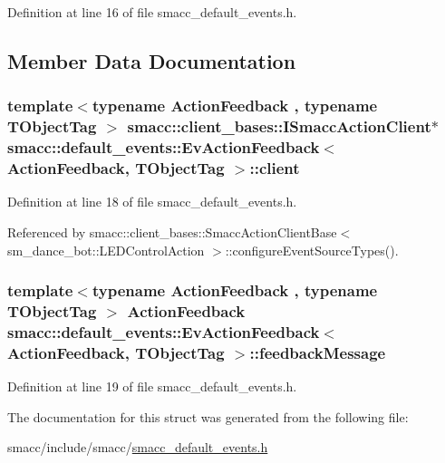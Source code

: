 Definition at line 16 of file smacc\+\_\+default\+\_\+events.\+h.



\subsection{Member Data Documentation}
\subsubsection[{\texorpdfstring{client}{client}}]{\setlength{\rightskip}{0pt plus 5cm}template$<$typename Action\+Feedback , typename T\+Object\+Tag $>$ {\bf smacc\+::client\+\_\+bases\+::\+I\+Smacc\+Action\+Client}$\ast$ {\bf smacc\+::default\+\_\+events\+::\+Ev\+Action\+Feedback}$<$ Action\+Feedback, T\+Object\+Tag $>$\+::client}\hypertarget{structsmacc_1_1default__events_1_1EvActionFeedback_a356e106d4c54e12dc81a0f3063ecff4a}{}\label{structsmacc_1_1default__events_1_1EvActionFeedback_a356e106d4c54e12dc81a0f3063ecff4a}


Definition at line 18 of file smacc\+\_\+default\+\_\+events.\+h.



Referenced by smacc\+::client\+\_\+bases\+::\+Smacc\+Action\+Client\+Base$<$ sm\+\_\+dance\+\_\+bot\+::\+L\+E\+D\+Control\+Action $>$\+::configure\+Event\+Source\+Types().

\subsubsection[{\texorpdfstring{feedback\+Message}{feedbackMessage}}]{\setlength{\rightskip}{0pt plus 5cm}template$<$typename Action\+Feedback , typename T\+Object\+Tag $>$ Action\+Feedback {\bf smacc\+::default\+\_\+events\+::\+Ev\+Action\+Feedback}$<$ Action\+Feedback, T\+Object\+Tag $>$\+::feedback\+Message}\hypertarget{structsmacc_1_1default__events_1_1EvActionFeedback_aa04da2789df313666c6aa9480dc8287d}{}\label{structsmacc_1_1default__events_1_1EvActionFeedback_aa04da2789df313666c6aa9480dc8287d}


Definition at line 19 of file smacc\+\_\+default\+\_\+events.\+h.



The documentation for this struct was generated from the following file\+:\begin{DoxyCompactItemize}
\item 
smacc/include/smacc/\hyperlink{smacc__default__events_8h}{smacc\+\_\+default\+\_\+events.\+h}\end{DoxyCompactItemize}
